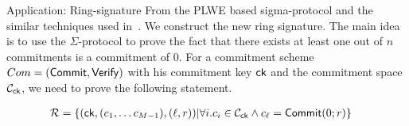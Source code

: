 \begin{section}{Application: Ring-signature}
  From the PLWE based sigma-protocol and
  the similar techniques used in~\cite{DBLP:conf/eurocrypt/GrothK15}.
  We construct the new ring signature.
  The main idea is to use the $\Sigma$-protocol to prove the fact that
  there exists at least one out of $n$ commitments is a commitment of $0$.
  For a commitment scheme $Com = ({\mathsf{Commit}}, {\mathsf{Verify}})$ with his commitment key $\mathsf{ck}$
  and the commitment space $\mathcal{C}_{\mathsf{ck}}$,
  we need to prove the following statement.

  \begin{align*}
    \mathcal{R} &= \{(\mathsf{ck}, (c_1, \dots c_{M-1}), (\ell, r)) | \forall i. c_i \in \mathcal{C}_{\mathsf{ck}} \wedge c_\ell = {\mathsf{Commit}}(0; r)\}
  \end{align*}



\end{section}
